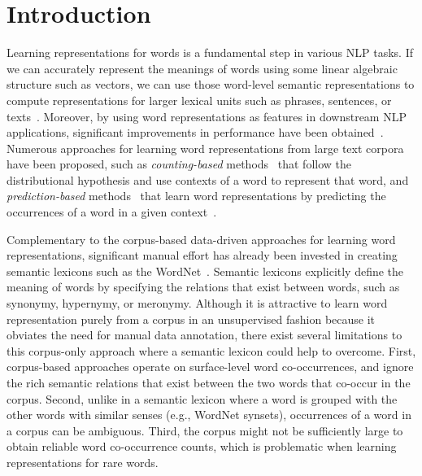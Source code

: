\documentclass[letterpaper]{article}
\begin{document}
\section{Introduction}
\label{sec:intro}

Learning representations for words is a fundamental step in various NLP tasks. If we can accurately represent the meanings of words
using some linear algebraic structure such as vectors, we can use those word-level semantic representations to compute
representations for larger lexical units such as phrases, sentences, 
or texts~\cite{socher-EtAl:2012:EMNLP-CoNLL,Le:ICML:2014}.
Moreover, by using word representations as features in downstream NLP applications, 
significant improvements in performance have been obtained~\cite{Turian:ACL:2010,Bollegala:ACL:2015,Collobert:2011}.
Numerous approaches for learning word representations from large text corpora have been proposed, such as 
\emph{counting-based} methods~\cite{Turney:JAIR:2010} that follow the distributional hypothesis and use contexts
 of a word to represent that word, and \emph{prediction-based} methods~\cite{Mikolov:NIPS:2013} 
 that learn word representations by predicting the occurrences 
 of a word in a given context~\cite{baroni-dinu-kruszewski:2014:P14-1}. 


Complementary to the corpus-based data-driven approaches for learning word representations, significant manual effort has
already been invested in creating semantic lexicons such as the WordNet~\cite{WordNet}. 
Semantic lexicons explicitly define the meaning of words by
specifying the relations that exist between words, such as synonymy, hypernymy, or meronymy. 
Although it is attractive to learn word representation purely from a corpus in an unsupervised fashion because it obviates the need
for manual data annotation, there exist several limitations to this corpus-only approach where a semantic lexicon could help to overcome.
First, corpus-based approaches operate on surface-level word co-occurrences, and ignore the rich semantic relations that exist
between the two words that co-occur in the corpus. 
Second, unlike in a semantic lexicon where a word is grouped with the other words with similar senses (e.g., WordNet synsets),
occurrences of a word in a corpus can be ambiguous. Third, the corpus might not be sufficiently large to obtain reliable
word co-occurrence counts, which is problematic when learning representations for rare words.
\end{document}
